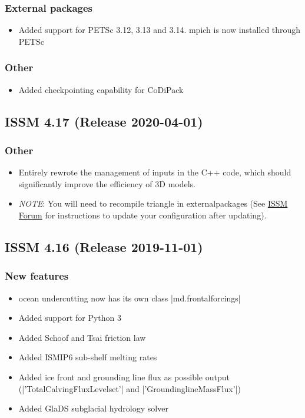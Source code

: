 \subsubsection{External packages}
\begin{itemize}
\item Added support for PETSc 3.12, 3.13 and 3.14. mpich is now installed through PETSc
\end{itemize}
\subsubsection{Other}
\begin{itemize}
\item Added checkpointing capability for CoDiPack
\end{itemize}

\subsection*{ISSM 4.17 (Release 2020-04-01)}
\subsubsection{Other}
\begin{itemize}
\item Entirely rewrote the management of inputs in the C++ code, which should significantly improve the efficiency of 3D models.
\item \emph{NOTE}: You will need to recompile triangle in externalpackages (See \href{https://issm.ess.uci.edu/forum/d/239-update-to-triangle}{ISSM Forum} for instructions to update your configuration after updating).
\end{itemize}

\subsection*{ISSM 4.16 (Release 2019-11-01)}
\subsubsection{New features}
\begin{itemize}
\item ocean undercutting now has its own class \lstinlinebg|md.frontalforcings|
\item Added support for Python 3
\item Added Schoof and Tsai friction law
\item Added ISMIP6 sub-shelf melting rates
\item Added ice front and grounding line flux as possible output (\lstinlinebg|'TotalCalvingFluxLevelset'| and \lstinlinebg|'GroundinglineMassFlux'|)
\item Added GlaDS subglacial hydrology solver
\end{itemize}
